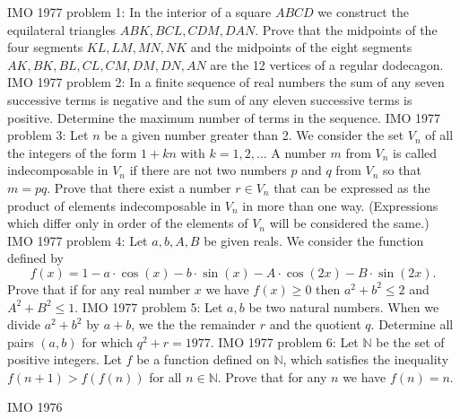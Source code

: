 IMO 1977 problem 1:  In the interior of a square $ABCD$ we construct the equilateral triangles $ABK, BCL, CDM, DAN.$ Prove that the midpoints of the four segments $KL, LM, MN, NK$ and the midpoints of the eight segments $AK, BK, BL, CL, CM, DM, DN, AN$ are the 12 vertices of a regular dodecagon. 
IMO 1977 problem 2:  In a finite sequence of real numbers the sum of any seven successive terms is negative and the sum of any eleven successive terms is positive. Determine the maximum number of terms in the sequence. 
IMO 1977 problem 3:  Let $n$ be a given number greater than 2. We consider the set $V_n$ of all the integers of the form $1 + kn$ with $k = 1, 2, \ldots$ A number $m$ from $V_n$ is called indecomposable in $V_n$ if there are not two numbers $p$ and $q$ from $V_n$ so that $m = pq.$ Prove that there exist a number $r \in V_n$ that can be expressed as the product of elements indecomposable in $V_n$ in more than one way. (Expressions which differ only in order of the elements of $V_n$ will be considered the same.) 
IMO 1977 problem 4:  Let $a,b,A,B$ be given reals. We consider the function defined by
\[ f(x) = 1 - a \cdot \cos(x) - b \cdot \sin(x) - A \cdot \cos(2x) - B \cdot \sin(2x). \]
Prove that if for any real number $x$ we have $f(x) \geq 0$ then $a^2 + b^2 \leq 2$ and $A^2 + B^2 \leq 1.$ 
IMO 1977 problem 5:  Let $a,b$ be two natural numbers. When we divide $a^2+b^2$ by $a+b$, we the the remainder $r$ and the quotient $q.$ Determine all pairs $(a, b)$ for which $q^2 + r = 1977.$ 
IMO 1977 problem 6:  Let $\mathbb{N}$ be the set of positive integers. Let $f$ be a function defined on $\mathbb{N}$, which satisfies the inequality $f(n + 1) > f(f(n))$ for all $n \in \mathbb{N}$. Prove that for any $n$ we have $f(n) = n.$ 

IMO 1976 

